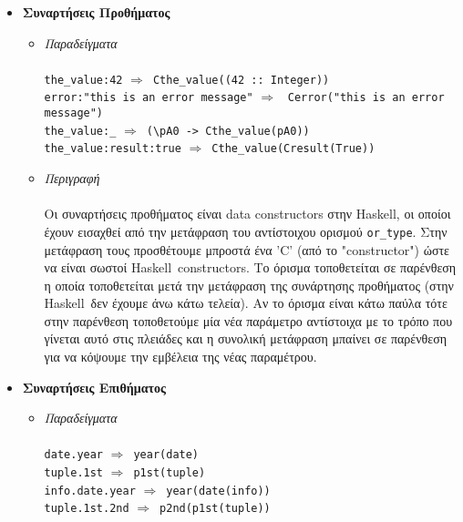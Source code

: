 \documentclass[diploma]{softlab-thesis}
\def\H{Haskell}
\def\lra{$\Longrightarrow$\ }
\begin{document}
\begin{itemize}
\item
\textbf{Συναρτήσεις Προθήματος}
\begin{itemize}
\item
\textit{Παραδείγματα}\\\\
\verb|the_value:42| \lra \verb|Cthe_value((42 :: Integer))| \\
\texttt{error:"this is an error message"} \lra
\texttt{Cerror("this is an error message")} \\
\verb|the_value:_| \lra \verb|(\pA0 -> Cthe_value(pA0))| \\
\verb|the_value:result:true| \lra \verb|Cthe_value(Cresult(True))| \\

\item
\textit{Περιγραφή}\\\\
Οι συναρτήσεις προθήματος είναι data constructors στην \H, οι οποίοι έχουν
εισαχθεί από την μετάφραση του αντίστοιχου ορισμού \verb|or_type|. Στην
μετάφραση τους προσθέτουμε μπροστά ένα 'C' (από το "constructor") ώστε να είναι
σωστοί \H\ constructors. Το όρισμα τοποθετείται σε παρένθεση η οποία
τοποθετείται μετά την μετάφραση της συνάρτησης προθήματος (στην \H\ δεν έχουμε
άνω κάτω τελεία). Αν το όρισμα είναι κάτω παύλα τότε στην παρένθεση τοποθετούμε
μία νέα παράμετρο αντίστοιχα με το τρόπο που γίνεται αυτό στις πλειάδες και
η συνολική μετάφραση μπαίνει σε παρένθεση για να κόψουμε την εμβέλεια της νέας
παραμέτρου.
\end{itemize}

\item
\textbf{Συναρτήσεις Επιθήματος}

\begin{itemize}
\item
\textit{Παραδείγματα}\\\\
\texttt{date.year} \lra \texttt{year(date)} \\
\texttt{tuple.1st} \lra \texttt{p1st(tuple)} \\
\texttt{info.date.year} \lra \texttt{year(date(info))} \\
\texttt{tuple.1st.2nd} \lra \texttt{p2nd(p1st(tuple))} \\


\end{itemize}
\end{itemize}
\end{document}
